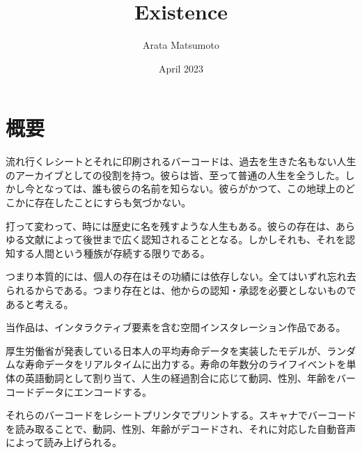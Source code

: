 \documentclass[a4paper]{article}
\title{Existence}
\author{Arata Matsumoto}
\date{April 2023}
\begin{document}
\maketitle
\section{概要}
流れ行くレシートとそれに印刷されるバーコードは、過去を生きた名もない人生のアーカイブとしての役割を持つ。彼らは皆、至って普通の人生を全うした。しかし今となっては、誰も彼らの名前を知らない。彼らがかつて、この地球上のどこかに存在したことにすらも気づかない。

打って変わって、時には歴史に名を残すような人生もある。彼らの存在は、あらゆる文献によって後世まで広く認知されることとなる。しかしそれも、それを認知する人間という種族が存続する限りである。

つまり本質的には、個人の存在はその功績には依存しない。全てはいずれ忘れ去られるからである。つまり存在とは、他からの認知・承認を必要としないものであると考える。

当作品は、インタラクティブ要素を含む空間インスタレーション作品である。

厚生労働省が発表している日本人の平均寿命データを実装したモデルが、ランダムな寿命データをリアルタイムに出力する。寿命の年数分のライフイベントを単体の英語動詞として割り当て、人生の経過割合に応じて動詞、性別、年齢をバーコードデータにエンコードする。

それらのバーコードをレシートプリンタでプリントする。スキャナでバーコードを読み取ることで、動詞、性別、年齢がデコードされ、それに対応した自動音声によって読み上げられる。
\end{document}
